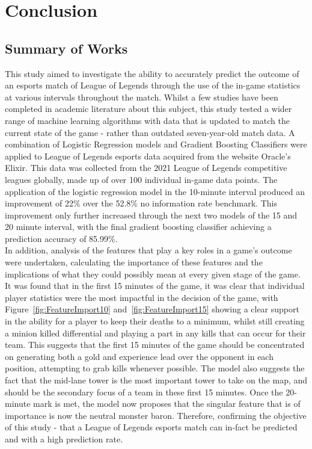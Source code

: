 \chapter{Conclusion}\label{ch:conclusion}

\section{Summary of Works}\label{sec:Summary of Works}

This study aimed to investigate the ability to accurately predict the outcome of an esports match of League of Legends through the use of the in-game statistics at various intervals throughout the match.
Whilst a few studies have been completed in academic literature about this subject, this study tested a wider range of machine learning algorithms with data that is updated to match the current state of the game - rather than outdated seven-year-old match data.
A combination of Logistic Regression models and Gradient Boosting Classifiers were applied to League of Legends esports data acquired from the website Oracle's Elixir.
This data was collected from the 2021 League of Legends competitive leagues globally, made up of over 100 individual in-game data points.
The application of the logistic regression model in the 10-minute interval produced an improvement of 22\% over the 52.8\% no information rate benchmark.
This improvement only further increased through the next two models of the 15 and 20 minute interval, with the final gradient boosting classifier achieving a prediction accuracy of 85.99\%. \\

In addition, analysis of the features that play a key roles in a game's outcome were undertaken, calculating the importance of these features and the implications of what they could possibly mean at every given stage of the game.
It was found that in the first 15 minutes of the game, it was clear that individual player  statistics were the most impactful in the decision of the game, with Figure~\ref{fig:FeatureImport10} and~\ref{fig:FeatureImport15} showing a clear support in the ability for a player to keep their deaths to a minimum, whilst still creating a minion killed differential and playing a part in any kills that can occur for their team.
This suggests that the first 15 minutes of the game should be concentrated on generating both a gold and experience lead over the opponent in each position, attempting to grab kills whenever possible.
The model also suggests the fact that the mid-lane tower is the most important tower to take on the map, and should be the secondary focus of a team in these first 15 minutes.
Once the 20-minute mark is met, the model now proposes that the singular feature that is of importance is now the neutral monster \ac{baron}.
Therefore, confirming the objective of this study - that a League of Legends esports match can in-fact be predicted and with a high prediction rate. \\

